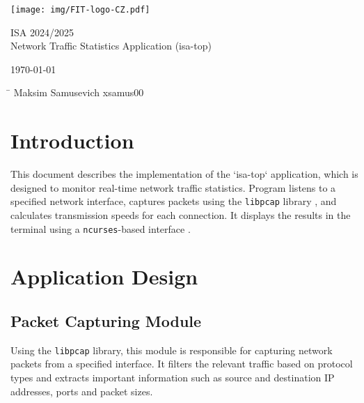 \documentclass[12pt]{extarticle}
\begin{document}
\begin{titlepage}
\begin{center}
   \texttt{[image: img/FIT-logo-CZ.pdf]}

    {\Huge ISA 2024/2025} \\ \vspace{1em}
    {\LARGE Network Traffic Statistics Application (isa-top)} \\
\end{center}
 {\Large \today}
 \hfill
 \begin{minipage}[t]{3\textwidth}
   \begin{tabbing}
   \hspace*{5.5cm}\=\hspace*{2cm} \kill
    \Large{Maksim Samusevich} \> \Large{xsamus00}\\
   \end{tabbing}
 \end{minipage}
\end{titlepage}

\tableofcontents
\newpage
\listoffigures

\newpage

\section{Introduction}

This document describes the implementation of the `isa-top` application, which is designed to monitor real-time network traffic statistics. Program listens to a specified network interface, captures packets using the \texttt{libpcap} library \cite{libpcap}, and calculates transmission speeds for each connection. It displays the results in the terminal using a \texttt{ncurses}-based interface \cite{ncurses}.




\section{Application Design}


\subsection{Packet Capturing Module}

Using the \texttt{libpcap} library, this module is responsible for capturing network packets from a specified interface. It filters the relevant traffic based on protocol types and extracts important information such as source and destination IP addresses, ports and packet sizes.
\end{document}
